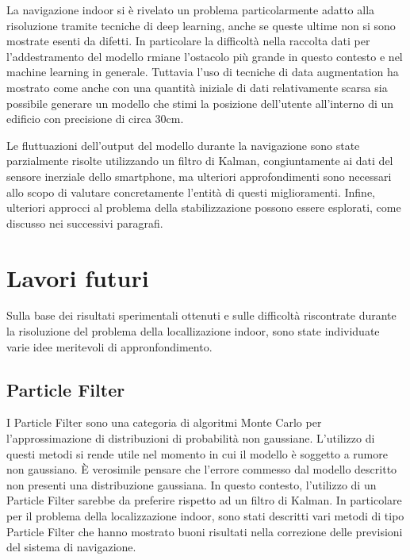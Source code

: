 
La navigazione indoor si è rivelato un problema particolarmente adatto alla
risoluzione tramite tecniche di deep learning, anche se queste ultime non si
sono mostrate esenti da difetti. In particolare la difficoltà nella raccolta
dati per l'addestramento del modello rmiane l'ostacolo più grande in questo
contesto e nel machine learning in generale. Tuttavia l'uso di tecniche di data
augmentation ha mostrato come anche con una quantità iniziale di dati
relativamente scarsa sia possibile generare un modello che stimi la posizione
dell'utente all'interno di un edificio con precisione di circa 30cm.

Le fluttuazioni dell'output del modello durante la navigazione sono state
parzialmente risolte utilizzando un filtro di Kalman, congiuntamente ai dati
del sensore inerziale dello smartphone, ma ulteriori approfondimenti sono
necessari allo scopo di valutare concretamente l'entità di questi
miglioramenti. Infine, ulteriori approcci al problema della stabilizzazione
possono essere esplorati, come discusso nei successivi paragrafi.
\section{Lavori futuri}
Sulla base dei risultati sperimentali ottenuti e sulle difficoltà riscontrate
durante la risoluzione del problema della locallizazione indoor, sono state
individuate varie idee meritevoli di appronfondimento.
\subsection{Particle Filter}
I Particle Filter sono una categoria di algoritmi Monte Carlo per
l'approssimazione di distribuzioni di probabilità non gaussiane. L'utilizzo di
questi metodi si rende utile nel momento in cui il modello è soggetto a rumore
non gaussiano. È verosimile pensare che l'errore commesso dal modello descritto
non presenti una distribuzione gaussiana. In questo contesto, l'utilizzo di un
Particle Filter sarebbe da preferire rispetto ad un filtro di Kalman. In
particolare per il problema della localizzazione indoor, sono stati descritti
vari metodi di tipo Particle Filter che hanno mostrato buoni risultati nella
correzione delle previsioni del sistema di navigazione\cite{particle-filter1,
  particle-filter2}.
